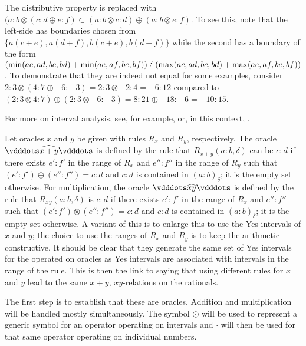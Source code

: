 \documentclass[12pt]{article}
\begin{document}
The distributive property is replaced with $( a:b \otimes ( c:d \oplus e:f) \subset (a:b \otimes c:d) \oplus (a:b \otimes e:f)$. To see this, note that the left-side has boundaries chosen from $\{a(c+e), a(d+f), b(c+e), b(d+f)\}$ while the second has a boundary of the form $(\min(ac, ad, bc, bd) + \min(ae, af, be, bf) ) \lte (\max(ac, ad, bc, bd) + \max(ae, af, be, bf) )$. To demonstrate that they are indeed not equal for some examples, consider $2:3 \otimes ( 4:7 \oplus -6:-3) = 2:3 \otimes -2:4 = -6:12$ compared to $(2:3 \otimes 4:7) \oplus (2:3 \otimes -6:-3) = 8:21 \oplus -18:-6 = -10:15$. 

For more on interval analysis, see, for example, \cite{moore} or, in this context, \cite{taylor23main}.


Let oracles $x$ and $y$ be given with rules $R_x$ and $R_y$, respectively. The oracle $\xora[x+y]$ is defined by the rule that $R_{x+y}(a:b, \delta)$ can be $c:d$ if there exists $e':f'$ in the range of $R_x$ and $e'': f''$ in the range of $R_y$ such that $(e':f') \oplus (e'':f'') = c:d$ and $c:d$ is contained in $(a:b)_\delta$; it is the empty set otherwise. For multiplication, the oracle $\xora[xy]$ is defined by the rule that $R_{xy}(a:b, \delta)$ is $c:d$ if there exists $e': f'$  in the range of $R_x$ and $e'':f''$ such that $(e':f') \otimes (e'':f'') = c:d$ and $c:d$ is contained in $(a:b)_\delta$; it is the empty set otherwise. A variant of this is to enlarge this to use the Yes intervals of $x$ and $y$; the choice to use the ranges of $R_x$ and $R_y$ is to keep the arithmetic constructive. It should be clear that they generate the same set of Yes intervals for the operated on oracles as Yes intervals are associated with intervals in the range of the rule. This is then the link to saying that using different rules for $x$ and $y$ lead to the same $x+y$, $xy$-relations on the rationals. 


The first step is to establish that these are oracles. Addition and multiplication will be handled mostly simultaneously. The symbol $\odot$ will be used to represent a generic symbol for an operator operating on intervals and $\cdot$ will then be used for that same operator operating on individual numbers.
\end{document}
